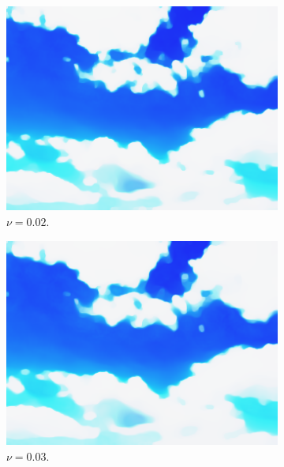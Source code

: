 \documentclass[abstracton]{scrreprt}
\begin{document}
            \begin{figure}[!ht]
                \centering
                \begin{subfigure}[b]{0.24\textwidth}
                    \includegraphics[width=\textwidth]{img/segmentation/cr/002blue.png}
                    \caption{$\nu = 0.02$.}
                \end{subfigure}
                \begin{subfigure}[b]{0.24\textwidth}
                    \includegraphics[width=\textwidth]{img/segmentation/cr/003blue.png}
                    \caption{$\nu = 0.03$.}
                \end{subfigure}
                \begin{subfigure}[b]{0.24\textwidth}

\end{subfigure}
\end{figure}
\end{document}
